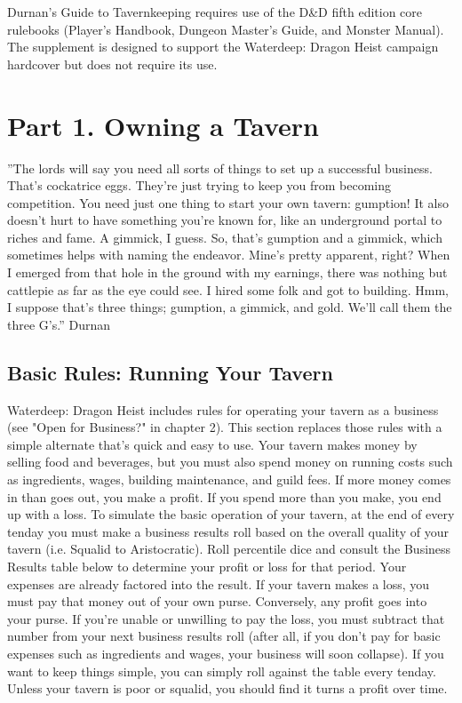 \documentclass[10pt,a4paper,twoside,twocolumn,openany,bg=print,nodeprecatedcode]{dndbook}
\begin{document}
Durnan's Guide to Tavernkeeping requires use of the D\&D fifth edition core rulebooks (Player's Handbook, Dungeon Master's Guide, and Monster Manual). The supplement is designed to support the Waterdeep: Dragon Heist campaign hardcover but does not require its use.
\chapter{Part 1. Owning a Tavern}
\DndQuote%
{}
{''The lords will say you need all sorts of things to set up a successful business. That's cockatrice eggs. They're just trying to keep you from becoming competition. You need just one thing to start your own tavern: gumption! It also doesn't hurt to have something you're known for, like an underground portal to riches and fame. A gimmick, I guess. So, that's gumption and a gimmick, which sometimes helps with naming the endeavor. Mine's pretty apparent, right? When I emerged from that hole in the ground with my earnings, there was nothing but cattlepie as far as the eye could see. I hired some folk and got to building. Hmm, I suppose that's three things; gumption, a gimmick, and gold. We'll call them the three G's.''}
{Durnan}
\section{Basic Rules: Running Your Tavern}
Waterdeep: Dragon Heist includes rules for operating your tavern as a business (see "Open for Business?" in chapter 2). This section replaces those rules with a simple alternate that's quick and easy to use.
Your tavern makes money by selling food and beverages, but you must also spend money on running costs such as ingredients, wages, building maintenance, and guild fees. If more money comes in than goes out, you make a profit. If you spend more than you make, you end up with a loss.
To simulate the basic operation of your tavern, at the end of every tenday you must make a business results roll based on the overall quality of your tavern (i.e. Squalid to Aristocratic). Roll percentile dice and consult the Business Results table below to determine your profit or loss for that period. Your expenses are already factored into the result.
If your tavern makes a loss, you must pay that money out of your own purse. Conversely, any profit goes into your purse. If you're unable or unwilling to pay the loss, you must subtract that number from your next business results roll (after all, if you don't pay for basic expenses such as ingredients and wages, your business will soon collapse).
If you want to keep things simple, you can simply roll against the table every tenday. Unless your tavern is poor or squalid, you should find it turns a profit over time.
\end{document}
